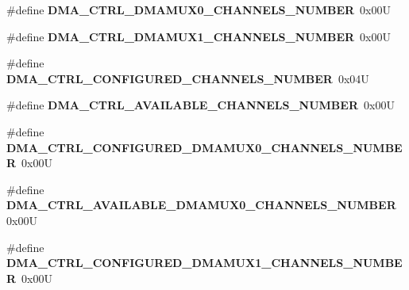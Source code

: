 \begin{DoxyCompactItemize}
\item 
\hypertarget{group___d_m_a___c_t_r_l__module_ga7b8c46627ab13e1bc670050cd9c98ec9}{\#define {\bfseries D\-M\-A\-\_\-\-C\-T\-R\-L\-\_\-\-D\-M\-A\-M\-U\-X0\-\_\-\-C\-H\-A\-N\-N\-E\-L\-S\-\_\-\-N\-U\-M\-B\-E\-R}~0x00\-U}\label{group___d_m_a___c_t_r_l__module_ga7b8c46627ab13e1bc670050cd9c98ec9}

\item 
\hypertarget{group___d_m_a___c_t_r_l__module_ga2a3b530e2e454b404ff7c3d1965cf6be}{\#define {\bfseries D\-M\-A\-\_\-\-C\-T\-R\-L\-\_\-\-D\-M\-A\-M\-U\-X1\-\_\-\-C\-H\-A\-N\-N\-E\-L\-S\-\_\-\-N\-U\-M\-B\-E\-R}~0x00\-U}\label{group___d_m_a___c_t_r_l__module_ga2a3b530e2e454b404ff7c3d1965cf6be}

\item 
\hypertarget{group___d_m_a___c_t_r_l__module_ga6d885587c92e7a55577b29edff3c32a2}{\#define {\bfseries D\-M\-A\-\_\-\-C\-T\-R\-L\-\_\-\-C\-O\-N\-F\-I\-G\-U\-R\-E\-D\-\_\-\-C\-H\-A\-N\-N\-E\-L\-S\-\_\-\-N\-U\-M\-B\-E\-R}~0x04\-U}\label{group___d_m_a___c_t_r_l__module_ga6d885587c92e7a55577b29edff3c32a2}

\item 
\hypertarget{group___d_m_a___c_t_r_l__module_ga21d73f75673cb544edaa2c5b1176e759}{\#define {\bfseries D\-M\-A\-\_\-\-C\-T\-R\-L\-\_\-\-A\-V\-A\-I\-L\-A\-B\-L\-E\-\_\-\-C\-H\-A\-N\-N\-E\-L\-S\-\_\-\-N\-U\-M\-B\-E\-R}~0x00\-U}\label{group___d_m_a___c_t_r_l__module_ga21d73f75673cb544edaa2c5b1176e759}

\item 
\hypertarget{group___d_m_a___c_t_r_l__module_ga45379f53e5b1d52b882d69fb59febdb4}{\#define {\bfseries D\-M\-A\-\_\-\-C\-T\-R\-L\-\_\-\-C\-O\-N\-F\-I\-G\-U\-R\-E\-D\-\_\-\-D\-M\-A\-M\-U\-X0\-\_\-\-C\-H\-A\-N\-N\-E\-L\-S\-\_\-\-N\-U\-M\-B\-E\-R}~0x00\-U}\label{group___d_m_a___c_t_r_l__module_ga45379f53e5b1d52b882d69fb59febdb4}

\item 
\hypertarget{group___d_m_a___c_t_r_l__module_ga99b97cc0c573c102eb5471f167a3c345}{\#define {\bfseries D\-M\-A\-\_\-\-C\-T\-R\-L\-\_\-\-A\-V\-A\-I\-L\-A\-B\-L\-E\-\_\-\-D\-M\-A\-M\-U\-X0\-\_\-\-C\-H\-A\-N\-N\-E\-L\-S\-\_\-\-N\-U\-M\-B\-E\-R}~0x00\-U}\label{group___d_m_a___c_t_r_l__module_ga99b97cc0c573c102eb5471f167a3c345}

\item 
\hypertarget{group___d_m_a___c_t_r_l__module_gaf204f504bd1bb63deaac05ab96012725}{\#define {\bfseries D\-M\-A\-\_\-\-C\-T\-R\-L\-\_\-\-C\-O\-N\-F\-I\-G\-U\-R\-E\-D\-\_\-\-D\-M\-A\-M\-U\-X1\-\_\-\-C\-H\-A\-N\-N\-E\-L\-S\-\_\-\-N\-U\-M\-B\-E\-R}~0x00\-U}\label{group___d_m_a___c_t_r_l__module_gaf204f504bd1bb63deaac05ab96012725}


\end{DoxyCompactItemize}
